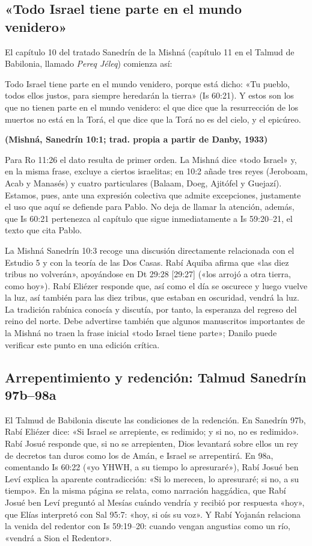\documentclass[11pt,letterpaper]{article}
\newcommand{\hebverso}[1]{\par\smallskip{\centering\begin{otherlanguage}{hebrew}\large #1\end{otherlanguage}\par}\smallskip}
\newcommand{\fuente}[1]{\par\hfill{\upshape\bfseries\small\textcolor{ladrillo}{#1}}}
\begin{document}
\subsection{«Todo Israel tiene parte en el mundo venidero»}
El capítulo 10 del tratado Sanedrín de la Mishná (capítulo 11 en el Talmud de Babilonia, llamado \emph{Pereq Jéleq}) comienza así:
\hebverso{כל ישראל יש להם חלק לעולם הבא}
\begin{cita}Todo Israel tiene parte en el mundo venidero, porque está dicho: «Tu pueblo, todos ellos justos, para siempre heredarán la tierra» (Is 60:21). Y estos son los que no tienen parte en el mundo venidero: el que dice que la resurrección de los muertos no está en la Torá, el que dice que la Torá no es del cielo, y el epicúreo.\fuente{(Mishná, Sanedrín 10:1; trad. propia a partir de Danby, 1933)}\end{cita}
Para Ro 11:26 el dato resulta de primer orden. La Mishná dice «todo Israel» y, en la misma frase, excluye a ciertos israelitas; en 10:2 añade tres reyes (Jeroboam, Acab y Manasés) y cuatro particulares (Balaam, Doeg, Ajitófel y Guejazí). Estamos, pues, ante una expresión colectiva que admite excepciones, justamente el uso que aquí se defiende para Pablo. No deja de llamar la atención, además, que Is 60:21 pertenezca al capítulo que sigue inmediatamente a Is 59:20--21, el texto que cita Pablo.

\begin{nota}
La Mishná Sanedrín 10:3 recoge una discusión directamente relacionada con el Estudio 5 y con la teoría de las Dos Casas. Rabí Aquiba afirma que «las diez tribus no volverán», apoyándose en Dt 29:28 [29:27] («los arrojó a otra tierra, como hoy»). Rabí Eliézer responde que, así como el día se oscurece y luego vuelve la luz, así también para las diez tribus, que estaban en oscuridad, vendrá la luz. La tradición rabínica conocía y discutía, por tanto, la esperanza del regreso del reino del norte. Debe advertirse también que algunos manuscritos importantes de la Mishná no traen la frase inicial «todo Israel tiene parte»; Danilo puede verificar este punto en una edición crítica.
\end{nota}

\subsection{Arrepentimiento y redención: Talmud Sanedrín 97b--98a}
El Talmud de Babilonia discute las condiciones de la redención. En Sanedrín 97b, Rabí Eliézer dice: «Si Israel se arrepiente, es redimido; y si no, no es redimido». Rabí Josué responde que, si no se arrepienten, Dios levantará sobre ellos un rey de decretos tan duros como los de Amán, e Israel se arrepentirá. En 98a, comentando Is 60:22 («yo YHWH, a su tiempo lo apresuraré»), Rabí Josué ben Leví explica la aparente contradicción: «Si lo merecen, lo apresuraré; si no, a su tiempo». En la misma página se relata, como narración haggádica, que Rabí Josué ben Leví preguntó al Mesías cuándo vendría y recibió por respuesta «hoy», que Elías interpretó con Sal 95:7: «hoy, si oís su voz». Y Rabí Yojanán relaciona la venida del redentor con Is 59:19--20: cuando vengan angustias como un río, «vendrá a Sion el Redentor».
\end{document}
